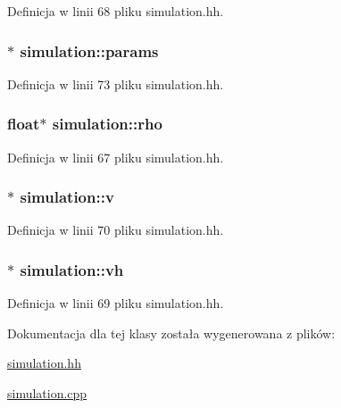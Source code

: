 Definicja w linii 68 pliku simulation.\+hh.

\hypertarget{classsimulation_a861b82cc3c0e7e58abfba464a133dae3}{}
\subsubsection[{params}]{$\ast$ simulation\+::params\hspace{0.3cm}{\ttfamily [private]}}\label{classsimulation_a861b82cc3c0e7e58abfba464a133dae3}


Definicja w linii 73 pliku simulation.\+hh.

\hypertarget{classsimulation_a44081d4edd92e17a3e1067b976031a00}{}
\subsubsection[{rho}]{\setlength{\rightskip}{0pt plus 5cm}float$\ast$ simulation\+::rho\hspace{0.3cm}{\ttfamily [private]}}\label{classsimulation_a44081d4edd92e17a3e1067b976031a00}


Definicja w linii 67 pliku simulation.\+hh.

\hypertarget{classsimulation_a39dbad79b1b8667840638a35e839a3f7}{}
\subsubsection[{v}]{$\ast$ simulation\+::v\hspace{0.3cm}{\ttfamily [private]}}\label{classsimulation_a39dbad79b1b8667840638a35e839a3f7}


Definicja w linii 70 pliku simulation.\+hh.

\hypertarget{classsimulation_ae6da1f15728f49be7b0793700866ede9}{}
\subsubsection[{vh}]{$\ast$ simulation\+::vh\hspace{0.3cm}{\ttfamily [private]}}\label{classsimulation_ae6da1f15728f49be7b0793700866ede9}


Definicja w linii 69 pliku simulation.\+hh.



Dokumentacja dla tej klasy została wygenerowana z plików\+:\begin{DoxyCompactItemize}
\item 
\hyperlink{simulation_8hh}{simulation.\+hh}\item 
\hyperlink{simulation_8cpp}{simulation.\+cpp}\end{DoxyCompactItemize}

